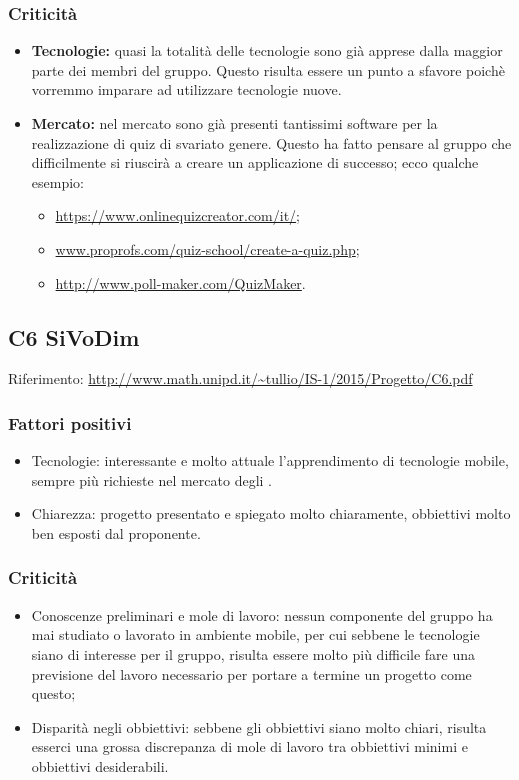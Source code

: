 \documentclass{scalatekids-article}
\begin{document}
\subsubsection{Criticità}
\begin{itemize}
\item \textbf{Tecnologie:} quasi la totalità delle tecnologie sono già apprese dalla maggior parte dei membri del gruppo. Questo risulta essere un punto a sfavore poichè vorremmo imparare ad utilizzare tecnologie nuove.
\item \textbf{Mercato:} nel mercato sono già presenti tantissimi software per la realizzazione di quiz di svariato genere. Questo ha fatto pensare al gruppo che difficilmente si riuscirà a creare un applicazione di successo; ecco qualche esempio:
  \begin{itemize}
  \item\url{https://www.onlinequizcreator.com/it/};
  \item\url{www.proprofs.com/quiz-school/create-a-quiz.php};
  \item\url{http://www.poll-maker.com/QuizMaker}.
  \end{itemize}
\end{itemize}

\subsection{C6 SiVoDim}
Riferimento: \url{http://www.math.unipd.it/~tullio/IS-1/2015/Progetto/C6.pdf}\\
\subsubsection{Fattori positivi}
\begin{itemize}
\item{Tecnologie:} interessante e molto attuale l'apprendimento di tecnologie mobile, sempre più richieste nel mercato degli .
\item{Chiarezza:} progetto presentato e spiegato molto chiaramente, obbiettivi molto ben esposti dal proponente.
\end{itemize}
\subsubsection{Criticità}
\begin{itemize}
\item{Conoscenze preliminari e mole di lavoro:} nessun componente del gruppo ha mai studiato o lavorato in ambiente mobile, per cui sebbene le tecnologie siano di interesse per il gruppo, risulta essere molto più difficile fare una previsione del lavoro necessario per portare a termine un progetto come questo;
\item{Disparità negli obbiettivi:} sebbene gli obbiettivi siano molto chiari, risulta esserci una grossa discrepanza di mole di lavoro tra obbiettivi minimi e obbiettivi desiderabili.
\end{itemize}
\end{document}
